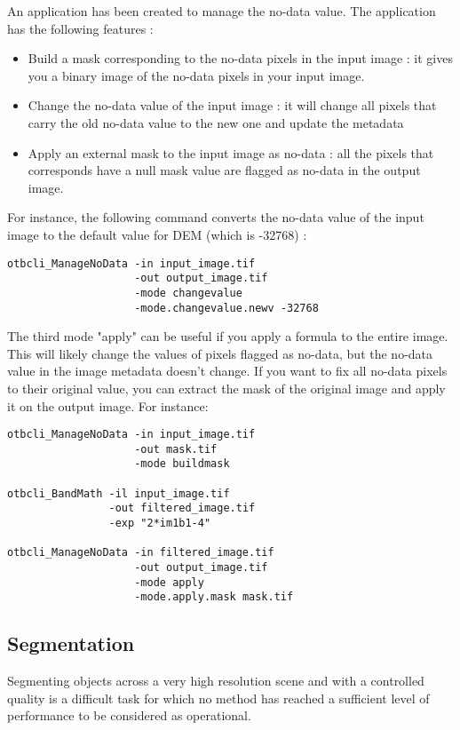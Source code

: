 An application has been created to manage the no-data value. The
 application has the following features :
\begin{itemize}
\item Build a mask corresponding to the no-data pixels in the input image : it gives you
a binary image of the no-data pixels in your input image.
\item Change the no-data value of the input image : it will change all pixels that carry
the old no-data value to the new one and update the metadata
\item Apply an external mask to the input image as no-data : all the pixels that
corresponds have a null mask value are flagged as no-data in the output image.
\end{itemize}

For instance, the following command converts the no-data value of the input
image to the default value for DEM (which is -32768) :
\begin{verbatim}
otbcli_ManageNoData -in input_image.tif
                    -out output_image.tif
                    -mode changevalue
                    -mode.changevalue.newv -32768
\end{verbatim}

The third mode "apply" can be useful if you apply a formula to the entire image.
This will likely change the values of pixels flagged as no-data, but the no-data
value in the image metadata doesn't change. If you want to
fix all no-data pixels to their original value, you can extract the mask of the
original image and apply it on the output image. For instance:
\begin{verbatim}
otbcli_ManageNoData -in input_image.tif
                    -out mask.tif
                    -mode buildmask

otbcli_BandMath -il input_image.tif
                -out filtered_image.tif
                -exp "2*im1b1-4"

otbcli_ManageNoData -in filtered_image.tif
                    -out output_image.tif
                    -mode apply
                    -mode.apply.mask mask.tif
\end{verbatim}

\subsection{Segmentation}\label{ssec:segmentation}

Segmenting objects across a very high resolution scene and with a controlled
quality is a difficult task for which no method has reached a sufficient level
of performance to be considered as operational.

